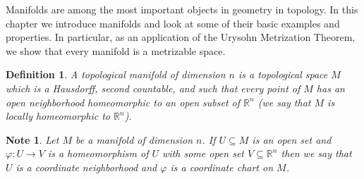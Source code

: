 \documentclass[11pt, letterpaper, oneside]{report}
\theoremstyle{pplain}
\newtheorem{ITERMVALUE THM}[theorem]{Intermediate Value Theorem}
\newtheorem{HEINEBOREL THM}[theorem]{Heine-Borel Theorem}
\newtheorem{UMETR THM}[theorem]{Urysohn Metrization Theorem}
\newtheorem{UMETR2 THM}[theorem]{Urysohn Metrization Theorem (v.2)}
\theoremstyle{ddefinition}
\newtheorem{definition}[theorem]{Definition}
\newtheorem{note}[theorem]{Note}
\theoremstyle{nnn}
\newtheorem{TDA NN}[theorem]{Topological Data Analysis. }
\theoremstyle{eexercise}
\newcommand{\R}{{\mathbb R}}
\begin{document}
\thispagestyle{firststyle}


Manifolds are among the most important objects  in geometry in topology. 
In this chapter we introduce manifolds and look at some of their basic examples and properties. 
In particular, as an application of  the Urysohn Metrization Theorem, we show that every manifold 
is a metrizable space. 

\begin{definition}
\label{MANIFOLD DEF}
A \emph{topological manifold of dimension $n$} is a topological space $M$
which is a Hausdorff, second countable, and such that
every point of $M$ has an open neighborhood  homeomorphic to an 
open subset of $\R^{n}$ (we say that $M$ is \emph{locally homeomorphic} to $\R^{n}$). 
\end{definition}


\begin{note}
Let $M$ be a manifold of dimension $n$. If $U\subseteq M$ is an open set and  $\varphi\colon U \to V$
is a homeomorphism of $U$ with some open set $V\subseteq \R^{n}$ then we say that  
$U$ is a \emph{coordinate neighborhood} and  $\varphi$ is 
a \emph{coordinate chart} on $M$.  
\end{note}
\end{document}
